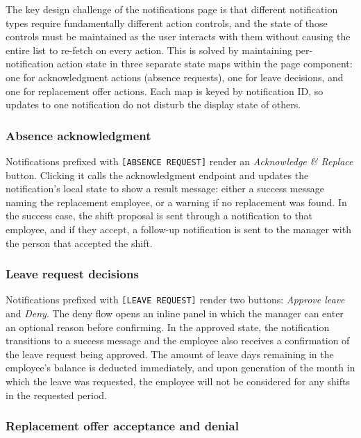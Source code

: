 \par The key design challenge of the notifications page is that different notification types require fundamentally different action controls, and the state of those controls must be maintained as the user interacts with them without causing the entire list to re-fetch on every action. This is solved by maintaining per-notification action state in three separate state maps within the page component: one for acknowledgment actions (absence requests), one for leave decisions, and one for replacement offer actions. Each map is keyed by notification ID, so updates to one notification do not disturb the display state of others.

\subsubsection*{Absence acknowledgment}

\par Notifications prefixed with \texttt{[ABSENCE REQUEST]} render an \emph{Acknowledge \& Replace} button. Clicking it calls the acknowledgment endpoint and updates the notification's local state to show a result message: either a success message naming the replacement employee, or a warning if no replacement was found. In the success case, the shift proposal is sent through a notification to that employee, and if they accept, a follow-up notification is sent to the manager with the person that accepted the shift.

\subsubsection*{Leave request decisions}

\par Notifications prefixed with \texttt{[LEAVE REQUEST]} render two buttons: \emph{Approve leave} and \emph{Deny}. The deny flow opens an inline panel in which the manager can enter an optional reason before confirming. In the approved state, the notification transitions to a success message and the employee also receives a confirmation of the leave request being approved. The amount of leave days remaining in the employee's balance is deducted immediately, and upon generation of the month in which the leave was requested, the employee will not be considered for any shifts in the requested period.

\subsubsection*{Replacement offer acceptance and denial}

